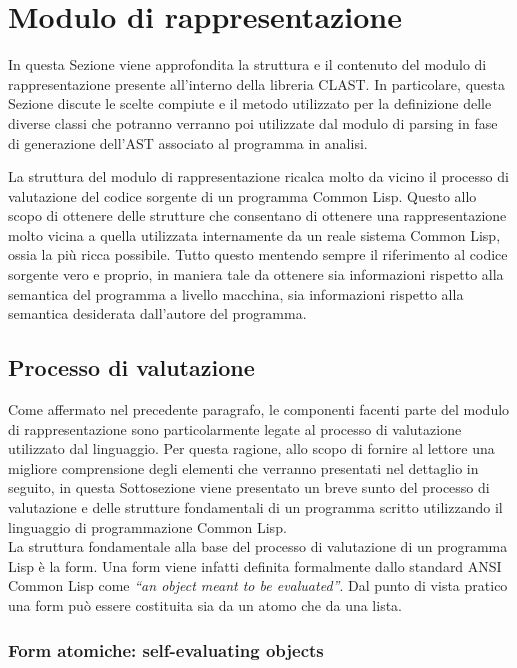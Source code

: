 \section{Modulo di rappresentazione}
\label{representation}

In questa Sezione viene approfondita la struttura e il contenuto del modulo di
rappresentazione presente all'interno della libreria CLAST. In particolare,
questa Sezione discute le scelte compiute e il metodo utilizzato per la
definizione delle diverse classi che potranno verranno poi utilizzate dal
modulo di parsing in fase di generazione dell'AST associato al programma in
analisi.

La struttura del modulo di rappresentazione ricalca molto da vicino il
processo di valutazione del codice sorgente di un programma Common Lisp.
Questo allo scopo di ottenere delle strutture che consentano di ottenere una
rappresentazione molto vicina a quella utilizzata internamente da un reale
sistema Common Lisp, ossia la più ricca possibile. Tutto questo mentendo
sempre il riferimento al codice sorgente vero e proprio, in maniera tale da
ottenere sia informazioni rispetto alla semantica del programma a livello
macchina, sia informazioni rispetto alla semantica desiderata dall’autore del
programma.

\subsection{Processo di valutazione}
\label{CL-valutazione}

Come affermato nel precedente paragrafo, le componenti facenti parte del
modulo di rappresentazione sono particolarmente legate al processo di
valutazione utilizzato dal linguaggio. Per questa ragione, allo scopo di
fornire al lettore una migliore comprensione degli elementi che verranno
presentati nel dettaglio in seguito, in questa Sottosezione viene presentato
un breve sunto del processo di valutazione e delle strutture fondamentali di
un programma scritto utilizzando il linguaggio di programmazione Common
Lisp.\\

La struttura fondamentale alla base del processo di valutazione di un
programma Lisp è la form. Una form viene infatti definita formalmente dallo
standard ANSI Common Lisp come \textit{“an object meant to be evaluated”}. Dal
punto di vista pratico una form può essere costituita sia da un atomo che da
una lista.

\subsubsection{Form atomiche: self-evaluating objects}

